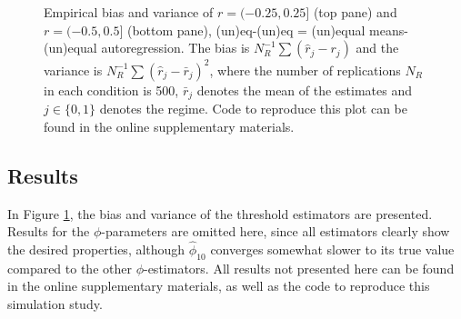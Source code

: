 \documentclass{article}
\begin{document}
\begin{figure}
\begin{center}
\end{center}
\caption{Empirical bias and variance of $r = (-0.25, 0.25]$ (top pane) and $r = (-0.5, 0.5]$ (bottom pane), (un)eq-(un)eq = (un)equal means-(un)equal autoregression. The bias is $N_R^{-1} \sum (\hat{r}_j - r_j)$ and the variance is $N_R^{-1} \sum (\hat{r}_j - \bar{r}_j)^2$, where the number of replications $N_R$ in each condition is 500, $\bar{r}_j$ denotes the mean of the estimates and $j \in \{0, 1\}$ denotes the regime. Code to reproduce this plot can be found in the online supplementary materials.}
\label{fig:simulation_study_2_results}
\end{figure}

\subsection{Results}
In Figure \ref{fig:simulation_study_2_results}, the bias and variance of the threshold estimators are presented.
Results for the $\phi$-parameters are omitted here, since all estimators clearly show the desired properties, although $\hat{\phi}_{10}$ converges somewhat slower to its true value compared to the other $\phi$-estimators. 
All results not presented here can be found in the online supplementary materials, as well as the code to reproduce this simulation study.
\end{document}
